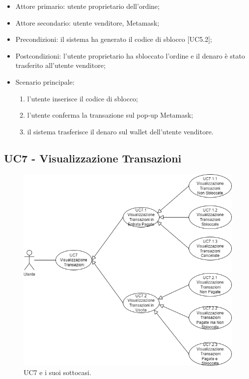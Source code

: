 \begin{itemize}
    \item Attore primario: utente proprietario dell'ordine;
    \item Attore secondario: utente venditore, Metamask;
    \item Precondizioni: il sistema ha generato il codice di sblocco [UC5.2];
    \item Postcondizioni: l'utente proprietario ha sbloccato l'ordine e il denaro è stato trasferito all'utente venditore;
    \item Scenario principale:
    \begin{enumerate}
        \item l'utente inserisce il codice di sblocco;
        \item l'utente conferma la transazione sul pop-up Metamask;
        \item il sistema trasferisce il denaro sul wallet dell'utente venditore.
    \end{enumerate}
\end{itemize}

\subsection{UC7 - Visualizzazione Transazioni}

\begin{figure}[H]
    \centering
    \includegraphics[scale=0.7]{immagini/UseCases-UC7.png}
    \caption{UC7 e i suoi sottocasi.}
  \end{figure}

